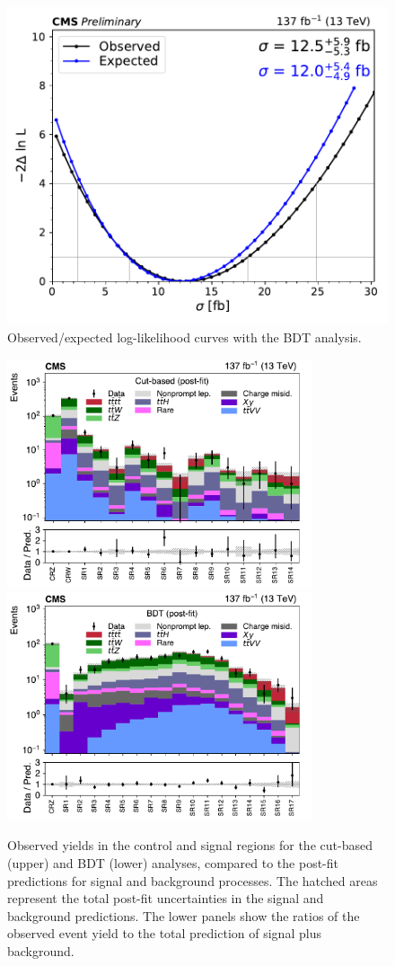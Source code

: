 \begin{figure}[!hbtp]
\centering
\includegraphics[width=.65\textwidth]{figs/ftan/likelihood_scan.pdf}
\caption{Observed/expected log-likelihood curves with the BDT analysis.}
\label{fig:ftnll}
\end{figure}

\begin{figure}[!hbtp]
\centering
\includegraphics[width=0.8\textwidth]{figs/ftp/SRCR_postfit.pdf} \\
\includegraphics[width=0.8\textwidth]{figs/ftp/SRDISC_postfit.pdf}
\caption{ Observed yields in the control and signal regions for the cut-based (upper) and BDT (lower) analyses,
compared to the post-fit predictions for signal and background processes.
The hatched areas represent the total post-fit uncertainties in the signal and background predictions.
The lower panels show the ratios of the observed event yield to the total prediction of
    signal plus background.
    }
\label{fig:srcr}
\end{figure}


